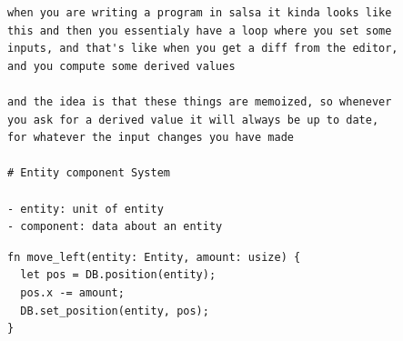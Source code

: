 \documentclass[12pt, a4paper]{report}
\begin{document}
\begin{Verbatim}
when you are writing a program in salsa it kinda looks like
this and then you essentialy have a loop where you set some
inputs, and that's like when you get a diff from the editor,
and you compute some derived values

and the idea is that these things are memoized, so whenever
you ask for a derived value it will always be up to date,
for whatever the input changes you have made

# Entity component System

- entity: unit of entity
- component: data about an entity
\end{Verbatim}

\begin{verbatim}
fn move_left(entity: Entity, amount: usize) {
  let pos = DB.position(entity);
  pos.x -= amount;
  DB.set_position(entity, pos);
}
\end{verbatim}
\end{document}
